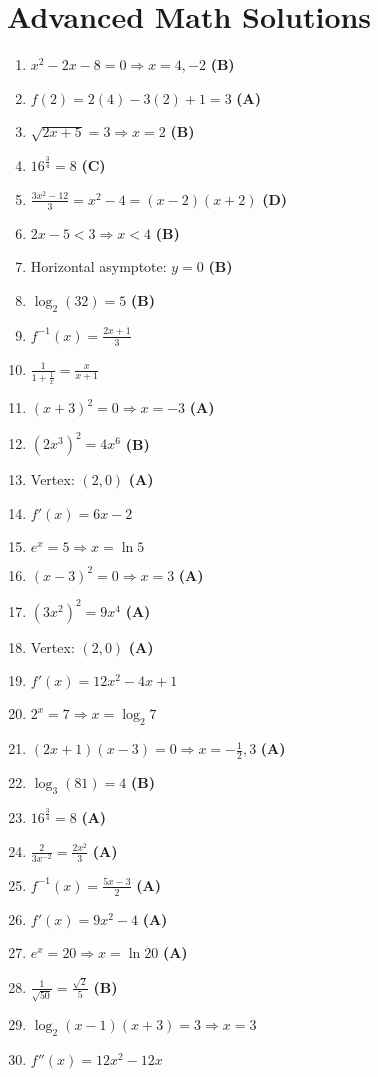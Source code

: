 \documentclass[12pt]{article}
\begin{document}
\newpage

\section{Advanced Math Solutions}
\begin{enumerate}[label=\textbf{Question \arabic*:}]
  \item \( x^2 - 2x - 8 = 0 \Rightarrow x = 4, -2 \) \textbf{(B)}
  \item \( f(2) = 2(4) - 3(2) + 1 = 3 \) \textbf{(A)}
  \item \( \sqrt{2x + 5} = 3 \Rightarrow x = 2 \) \textbf{(B)}
  \item \( 16^{\frac{3}{4}} = 8 \) \textbf{(C)}
  \item \( \frac{3x^2 - 12}{3} = x^2 - 4 = (x - 2)(x + 2) \) \textbf{(D)}
  \item \( 2x - 5 < 3 \Rightarrow x < 4 \) \textbf{(B)}
  \item Horizontal asymptote: \( y = 0 \) \textbf{(B)}
  \item \( \log_2(32) = 5 \) \textbf{(B)}
  \item \( f^{-1}(x) = \frac{2x + 1}{3} \)
  \item \( \frac{1}{1 + \frac{1}{x}} = \frac{x}{x + 1} \)
  \item \( (x + 3)^2 = 0 \Rightarrow x = -3 \) \textbf{(A)}
  \item \( (2x^3)^2 = 4x^6 \) \textbf{(B)}
  \item Vertex: \( (2, 0) \) \textbf{(A)}
  \item \( f'(x) = 6x - 2 \)
  \item \( e^x = 5 \Rightarrow x = \ln 5 \)
  \item \( (x - 3)^2 = 0 \Rightarrow x = 3 \) \textbf{(A)}
  \item \( (3x^2)^2 = 9x^4 \) \textbf{(A)}
  \item Vertex: \( (2, 0) \) \textbf{(A)}
  \item \( f'(x) = 12x^2 - 4x + 1 \)
  \item \( 2^x = 7 \Rightarrow x = \log_2 7 \)
  \item \( (2x + 1)(x - 3) = 0 \Rightarrow x = -\frac{1}{2}, 3 \) \textbf{(A)}
  \item \( \log_3(81) = 4 \) \textbf{(B)}
  \item \( 16^{\frac{3}{4}} = 8 \) \textbf{(A)}
  \item \( \frac{2}{3x^{-2}} = \frac{2x^2}{3} \) \textbf{(A)}
  \item \( f^{-1}(x) = \frac{5x - 3}{2} \) \textbf{(A)}
  \item \( f'(x) = 9x^2 - 4 \) \textbf{(A)}
  \item \( e^x = 20 \Rightarrow x = \ln 20 \) \textbf{(A)}
  \item \( \frac{1}{\sqrt{50}} = \frac{\sqrt{2}}{5} \) \textbf{(B)}
  \item \( \log_2(x - 1)(x + 3) = 3 \Rightarrow x = 3 \)
  \item \( f''(x) = 12x^2 - 12x \)
\end{enumerate}
\end{document}
